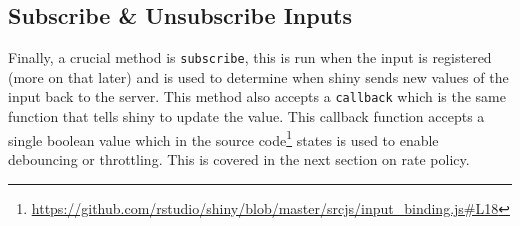 \documentclass[
]{krantz}
\makeatletter
\newenvironment{Shaded}{\begin{snugshade}}{\end{snugshade}}
\newcommand{\AttributeTok}[1]{\textcolor[rgb]{0.61,0.61,0.61}{#1}}
\newcommand{\CommentTok}[1]{\textcolor[rgb]{0.37,0.37,0.37}{\textit{#1}}}
\newcommand{\ControlFlowTok}[1]{\textcolor[rgb]{0.27,0.27,0.27}{\textbf{#1}}}
\newcommand{\DataTypeTok}[1]{\textcolor[rgb]{0.27,0.27,0.27}{#1}}
\newcommand{\KeywordTok}[1]{\textcolor[rgb]{0.27,0.27,0.27}{\textbf{#1}}}
\newcommand{\NormalTok}[1]{#1}
\newcommand{\OperatorTok}[1]{\textcolor[rgb]{0.43,0.43,0.43}{\textbf{#1}}}
\newcommand{\StringTok}[1]{\textcolor[rgb]{0.5,0.5,0.5}{#1}}
\newcommand{\VariableTok}[1]{\textcolor[rgb]{0,0,0}{#1}}
\renewcommand{\href}[2]{#2\footnote{\url{#1}}}
\newenvironment{kframe}{%
\medskip{}
\setlength{\fboxsep}{.8em}
 \def\at@end@of@kframe{}%
 \ifinner\ifhmode%
  \def\at@end@of@kframe{\end{minipage}}%
  \begin{minipage}{\columnwidth}%
 \fi\fi%
 \def\FrameCommand##1{\hskip\@totalleftmargin \hskip-\fboxsep
 \colorbox{shadecolor}{##1}\hskip-\fboxsep
     \hskip-\linewidth \hskip-\@totalleftmargin \hskip\columnwidth}%
 \MakeFramed {\advance\hsize-\width
   \@totalleftmargin\z@ \linewidth\hsize
   \@setminipage}}%
 {\par\unskip\endMakeFramed%
 \at@end@of@kframe}
\renewenvironment{Shaded}{\begin{kframe}}{\end{kframe}}
\makeatother
\begin{document}
\begin{Shaded}
\end{Shaded}

\hypertarget{shiny-input-sub-unsub}{%
\subsection{Subscribe \& Unsubscribe Inputs}\label{shiny-input-sub-unsub}}

Finally, a crucial method is \texttt{subscribe}, this is run when the input is registered (more on that later) and is used to determine when shiny sends new values of the input back to the server. This method also accepts a \texttt{callback} which is the same function that tells shiny to update the value. This callback function accepts a single boolean value which in the \href{https://github.com/rstudio/shiny/blob/master/srcjs/input_binding.js\#L18}{source code} states is used to enable debouncing or throttling. This is covered in the next section on rate policy.
\end{document}

